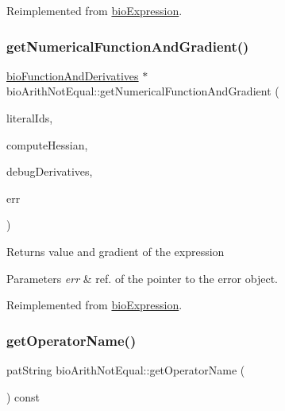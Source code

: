 Reimplemented from \hyperlink{classbio_expression_a3e4b4dca58dbbc6f0e411b30eb3f60b4}{bio\+Expression}.

\mbox{\label{classbio_arith_not_equal_ad9f06b2145f70fc6ebebc5bca51b5aa8}} 
\subsubsection{\texorpdfstring{get\+Numerical\+Function\+And\+Gradient()}{getNumericalFunctionAndGradient()}}
{\footnotesize\ttfamily \hyperlink{classbio_function_and_derivatives}{bio\+Function\+And\+Derivatives} $\ast$ bio\+Arith\+Not\+Equal\+::get\+Numerical\+Function\+And\+Gradient (\begin{DoxyParamCaption}\item[{vector$<$ pat\+U\+Long $>$}]{literal\+Ids,  }\item[{pat\+Boolean}]{compute\+Hessian,  }\item[{pat\+Boolean}]{debug\+Derivatives,  }\item[{pat\+Error $\ast$\&}]{err }\end{DoxyParamCaption})\hspace{0.3cm}{\ttfamily [virtual]}}

\begin{DoxyReturn}{Returns}
value and gradient of the expression 
\end{DoxyReturn}

\begin{DoxyParams}{Parameters}
{\em err} & ref. of the pointer to the error object. \\
\hline
\end{DoxyParams}


Reimplemented from \hyperlink{classbio_expression_a91c81ce80c9e972c913b10f5f3c1ed13}{bio\+Expression}.

\mbox{\label{classbio_arith_not_equal_a70bfdbd3473869466dc02e026620996c}} 
\subsubsection{\texorpdfstring{get\+Operator\+Name()}{getOperatorName()}}
{\footnotesize\ttfamily pat\+String bio\+Arith\+Not\+Equal\+::get\+Operator\+Name (\begin{DoxyParamCaption}{ }\end{DoxyParamCaption}) const\hspace{0.3cm}{\ttfamily [virtual]}}

